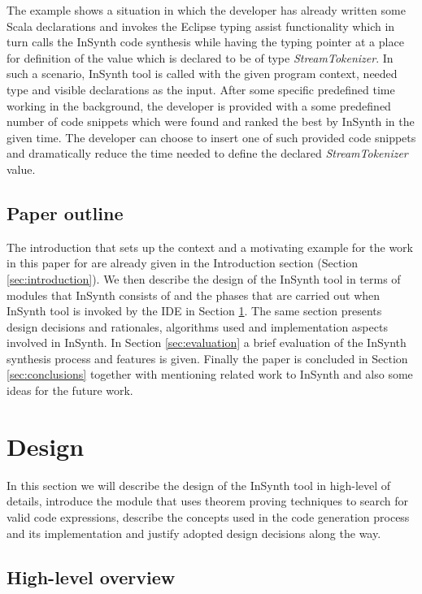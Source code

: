 \documentclass[preprint, nocopyrightspace]{sigplanconf}
\begin{document}
The example shows a situation in which the developer has already written some Scala declarations and invokes the Eclipse typing assist functionality which in turn calls the InSynth code synthesis while having the typing pointer at a place for definition of the value which is declared to be of type \textit{StreamTokenizer}.
In such a scenario, InSynth tool is called with the given program context, needed type and visible declarations as the input.
After some specific predefined time working in the background, the developer is provided with a some predefined number of code snippets which were found and ranked the best by InSynth in the given time.
The developer can choose to insert one of such provided code snippets and dramatically reduce the time needed to define the declared \textit{StreamTokenizer} value.
 
 
\subsection{Paper outline}

The introduction that sets up the context and a motivating example for the work in this paper for are already given in the Introduction section (Section \ref{sec:introduction}).
We then describe the design of the InSynth tool in terms of modules that InSynth consists of and the phases that are carried out when InSynth tool is invoked by the IDE in Section \ref{sec:design}.
The same section presents design decisions and rationales, algorithms used and implementation aspects involved in InSynth.
In Section \ref{sec:evaluation} a brief evaluation of the InSynth synthesis process and features is given.
Finally the paper is concluded in Section \ref{sec:conclusions} together with mentioning related work to InSynth and also some ideas for the future work.  
 
\section{Design}
\label{sec:design}

In this section we will describe the design of the InSynth tool in high-level of details, introduce the module that uses theorem proving techniques to search for valid code expressions, describe the concepts used in the code generation process and its implementation and justify adopted design decisions along the way. 

\subsection{High-level overview}
\end{document}
